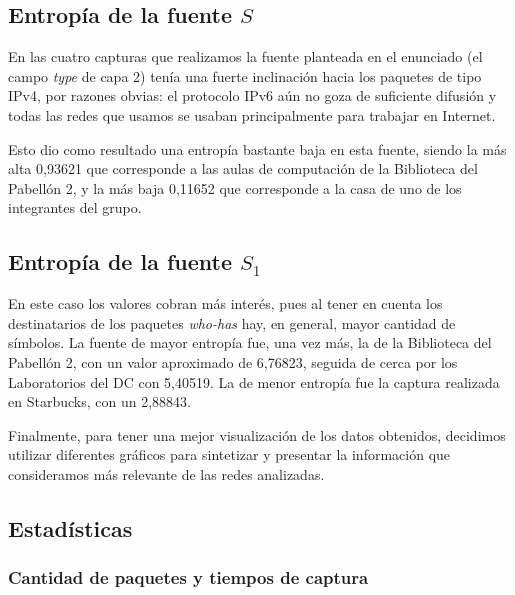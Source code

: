 

\subsection{Entropía de la fuente $S$}
En las cuatro capturas que realizamos la fuente planteada en el enunciado (el campo \textit{type} de capa 2) tenía una fuerte inclinación hacia los paquetes de tipo IPv4, por razones obvias: el protocolo IPv6 aún no goza de suficiente difusión y todas las redes que usamos se usaban principalmente para trabajar en Internet.

Esto dio como resultado una entropía bastante baja en esta fuente, siendo la más alta 0,93621 que corresponde a las aulas de computación de la Biblioteca del Pabellón 2, y la más baja 0,11652 que corresponde a la casa de uno de los integrantes del grupo.

\subsection{Entropía de la fuente $S_{1}$}
En este caso los valores cobran más interés, pues al tener en cuenta los destinatarios de los paquetes \textit{who-has} hay, en general, mayor cantidad de símbolos. La fuente de mayor entropía fue, una vez más, la de la Biblioteca del Pabellón 2, con un valor aproximado de 6,76823, seguida de cerca por los Laboratorios del DC con 5,40519. La de menor entropía fue la captura realizada en Starbucks, con un 2,88843.

Finalmente, para tener una mejor visualización de los datos obtenidos, decidimos
utilizar diferentes gráficos para sintetizar y presentar la información que
consideramos más relevante de las redes analizadas.

\subsection{Estadísticas}
\subsubsection{Cantidad de paquetes y tiempos de captura}

